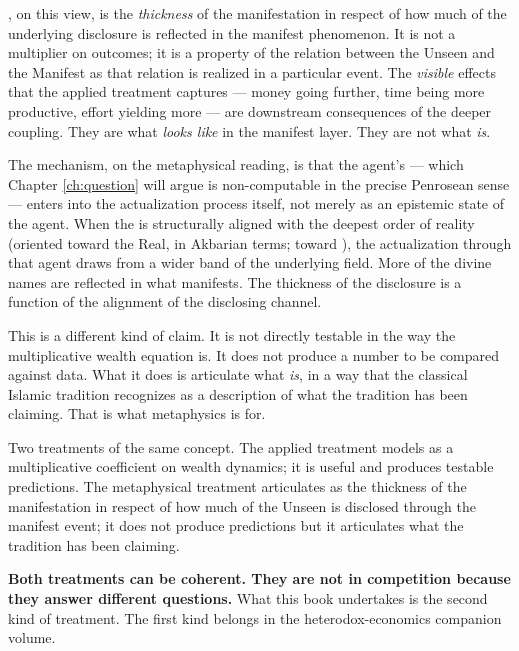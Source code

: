, on this view, is the \emph{thickness} of the manifestation
in respect of how much of the underlying disclosure is reflected in the
manifest phenomenon. It is not a multiplier on outcomes; it is a
property of the relation between the Unseen and the Manifest as that
relation is realized in a particular event. The \emph{visible} effects
that the applied treatment captures --- money going further, time being
more productive, effort yielding more --- are downstream consequences of
the deeper coupling. They are what  \emph{looks like} in
the manifest layer. They are not what  \emph{is}.

The mechanism, on the metaphysical reading, is that the agent's
 --- which Chapter \ref{ch:question} will argue is
non-computable in the precise Penrosean sense --- enters into the
actualization process itself, not merely as an epistemic state of the
agent. When the  is structurally aligned with the deepest
order of reality (oriented toward the Real, in Akbarian terms; toward
), the actualization through that agent draws from a wider
band of the underlying field. More of the divine names are reflected
in what manifests. The thickness of the disclosure is a function of
the alignment of the disclosing channel.

This is a different kind of claim. It is not directly testable in the
way the multiplicative wealth equation is. It does not produce a number
to be compared against data. What it does is articulate what
 \emph{is}, in a way that the classical Islamic tradition
recognizes as a description of what the tradition has been claiming.
That is what metaphysics is for.

\begin{summarybox}
Two treatments of the same concept. The applied treatment models
 as a multiplicative coefficient on wealth dynamics; it
is useful and produces testable predictions. The metaphysical
treatment articulates  as the thickness of the
manifestation in respect of how much of the Unseen is disclosed
through the manifest event; it does not produce predictions but it
articulates what the tradition has been claiming.

\textbf{Both treatments can be coherent. They are not in competition
because they answer different questions.} What this book undertakes
is the second kind of treatment. The first kind belongs in the
heterodox-economics companion volume.
\end{summarybox}

